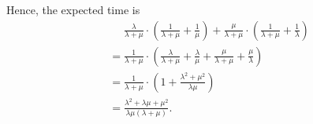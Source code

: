 \begin{enumerate}
          Hence, the expected time is
          \begin{align*}
               & \phantom{=} \frac{\lambda}{\lambda + \mu} \cdot \left(\frac{1}{\lambda + \mu} + \frac{1}{\mu}\right) + \frac{\mu}{\lambda + \mu} \cdot \left(\frac{1}{\lambda + \mu} + \frac{1}{\lambda}\right) \\
               & = \frac{1}{\lambda + \mu} \cdot \left(\frac{\lambda}{\lambda + \mu} + \frac{\lambda}{\mu} + \frac{\mu}{\lambda + \mu} + \frac{\mu}{\lambda}\right)                                              \\
               & = \frac{1}{\lambda + \mu} \cdot \left(1 + \frac{\lambda^2 + \mu^2}{\lambda \mu}\right)                                                                                                          \\
               & = \frac{\lambda^2 + \lambda \mu + \mu^2}{\lambda \mu (\lambda + \mu)}.
          \end{align*}
\end{enumerate}